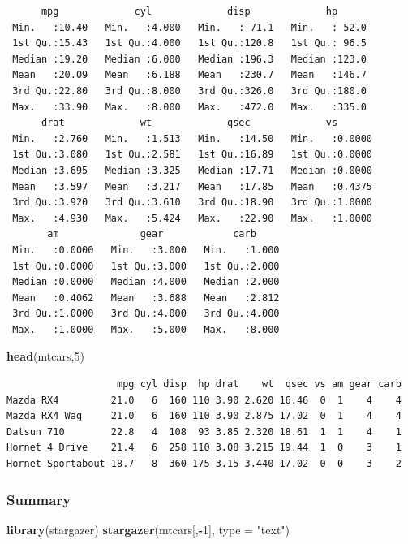 \documentclass[
]{article}
\newenvironment{Shaded}{\begin{snugshade}}{\end{snugshade}}
\newcommand{\AttributeTok}[1]{\textcolor[rgb]{0.13,0.29,0.53}{#1}}
\newcommand{\DecValTok}[1]{\textcolor[rgb]{0.00,0.00,0.81}{#1}}
\newcommand{\FunctionTok}[1]{\textcolor[rgb]{0.13,0.29,0.53}{\textbf{#1}}}
\newcommand{\NormalTok}[1]{#1}
\newcommand{\SpecialCharTok}[1]{\textcolor[rgb]{0.81,0.36,0.00}{\textbf{#1}}}
\newcommand{\StringTok}[1]{\textcolor[rgb]{0.31,0.60,0.02}{#1}}
\begin{document}
\begin{verbatim}
      mpg             cyl             disp             hp       
 Min.   :10.40   Min.   :4.000   Min.   : 71.1   Min.   : 52.0  
 1st Qu.:15.43   1st Qu.:4.000   1st Qu.:120.8   1st Qu.: 96.5  
 Median :19.20   Median :6.000   Median :196.3   Median :123.0  
 Mean   :20.09   Mean   :6.188   Mean   :230.7   Mean   :146.7  
 3rd Qu.:22.80   3rd Qu.:8.000   3rd Qu.:326.0   3rd Qu.:180.0  
 Max.   :33.90   Max.   :8.000   Max.   :472.0   Max.   :335.0  
      drat             wt             qsec             vs        
 Min.   :2.760   Min.   :1.513   Min.   :14.50   Min.   :0.0000  
 1st Qu.:3.080   1st Qu.:2.581   1st Qu.:16.89   1st Qu.:0.0000  
 Median :3.695   Median :3.325   Median :17.71   Median :0.0000  
 Mean   :3.597   Mean   :3.217   Mean   :17.85   Mean   :0.4375  
 3rd Qu.:3.920   3rd Qu.:3.610   3rd Qu.:18.90   3rd Qu.:1.0000  
 Max.   :4.930   Max.   :5.424   Max.   :22.90   Max.   :1.0000  
       am              gear            carb      
 Min.   :0.0000   Min.   :3.000   Min.   :1.000  
 1st Qu.:0.0000   1st Qu.:3.000   1st Qu.:2.000  
 Median :0.0000   Median :4.000   Median :2.000  
 Mean   :0.4062   Mean   :3.688   Mean   :2.812  
 3rd Qu.:1.0000   3rd Qu.:4.000   3rd Qu.:4.000  
 Max.   :1.0000   Max.   :5.000   Max.   :8.000  
\end{verbatim}

\begin{Shaded}
\begin{Highlighting}[]
\FunctionTok{head}\NormalTok{(mtcars,}\DecValTok{5}\NormalTok{)}
\end{Highlighting}
\end{Shaded}

\begin{verbatim}
                   mpg cyl disp  hp drat    wt  qsec vs am gear carb
Mazda RX4         21.0   6  160 110 3.90 2.620 16.46  0  1    4    4
Mazda RX4 Wag     21.0   6  160 110 3.90 2.875 17.02  0  1    4    4
Datsun 710        22.8   4  108  93 3.85 2.320 18.61  1  1    4    1
Hornet 4 Drive    21.4   6  258 110 3.08 3.215 19.44  1  0    3    1
Hornet Sportabout 18.7   8  360 175 3.15 3.440 17.02  0  0    3    2
\end{verbatim}

\subsubsection{Summary}\label{summary}

\begin{Shaded}
\begin{Highlighting}[]
\FunctionTok{library}\NormalTok{(stargazer)}
\FunctionTok{stargazer}\NormalTok{(mtcars[,}\SpecialCharTok{{-}}\DecValTok{1}\NormalTok{], }\AttributeTok{type =} \StringTok{"text"}\NormalTok{)}
\end{Highlighting}
\end{Shaded}
\end{document}
